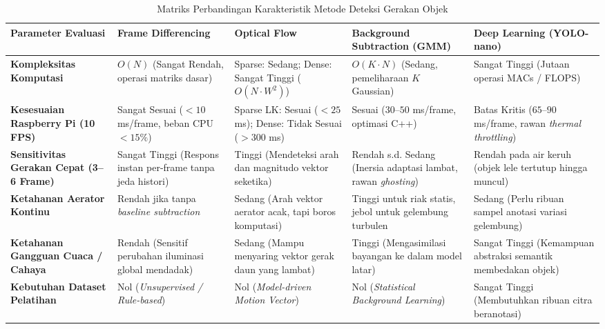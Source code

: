 \begin{table}[htbp]
\centering
\caption{Matriks Perbandingan Karakteristik Metode Deteksi Gerakan Objek}
\label{tab:method-comparison}
\begin{small}
\begin{tabularx}{\textwidth}{p{3.2cm} X X X X}
\toprule
\textbf{Parameter Evaluasi} & \textbf{Frame Differencing} & \textbf{Optical Flow} & \textbf{Background Subtraction (GMM)} & \textbf{Deep Learning (YOLO-nano)} \\
\midrule
\textbf{Kompleksitas Komputasi} & $O(N)$ (Sangat Rendah, operasi matriks dasar) & Sparse: Sedang; Dense: Sangat Tinggi ($O(N \cdot W^2)$) & $O(K \cdot N)$ (Sedang, pemeliharaan $K$ Gaussian) & Sangat Tinggi (Jutaan operasi MACs / FLOPS) \\
\addlinespace
\textbf{Kesesuaian Raspberry Pi (10 FPS)} & Sangat Sesuai ($<10$ ms/frame, beban CPU $<15\%$) & Sparse LK: Sesuai ($<25$ ms); Dense: Tidak Sesuai ($>300$ ms) & Sesuai ($30$--$50$ ms/frame, optimasi C++) & Batas Kritis ($65$--$90$ ms/frame, rawan \textit{thermal throttling}) \\
\addlinespace
\textbf{Sensitivitas Gerakan Cepat (3--6 Frame)} & Sangat Tinggi (Respons instan per-frame tanpa jeda histori) & Tinggi (Mendeteksi arah dan magnitudo vektor seketika) & Rendah s.d. Sedang (Inersia adaptasi lambat, rawan \textit{ghosting}) & Rendah pada air keruh (objek lele tertutup hingga muncul) \\
\addlinespace
\textbf{Ketahanan Aerator Kontinu} & Rendah jika tanpa \textit{baseline subtraction} & Sedang (Arah vektor aerator acak, tapi boros komputasi) & Tinggi untuk riak statis, jebol untuk gelembung turbulen & Sedang (Perlu ribuan sampel anotasi variasi gelembung) \\
\addlinespace
\textbf{Ketahanan Gangguan Cuaca / Cahaya} & Rendah (Sensitif perubahan iluminasi global mendadak) & Sedang (Mampu menyaring vektor gerak daun yang lambat) & Tinggi (Mengasimilasi bayangan ke dalam model latar) & Sangat Tinggi (Kemampuan abstraksi semantik membedakan objek) \\
\addlinespace
\textbf{Kebutuhan Dataset Pelatihan} & Nol (\textit{Unsupervised / Rule-based}) & Nol (\textit{Model-driven Motion Vector}) & Nol (\textit{Statistical Background Learning}) & Sangat Tinggi (Membutuhkan ribuan citra beranotasi) \\
\bottomrule
\end{tabularx}
\end{small}
\end{table}
